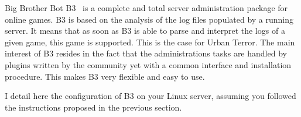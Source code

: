 %   
%
%
%
%

Big Brother Bot B3~\cite{b3} is a complete and total server administration
package for online games. 
B3 is based on the analysis of the log files populated by a running server. 
It means that as soon as B3 is able to parse and interpret the logs of a given
game, this game is supported. This is the case for Urban Terror. 
The main interest of B3 resides in the fact that the administrations tasks are
handled by plugins written by the community yet with a common interface and
installation procedure. This makes B3 very flexible and easy to use. 

I detail here the configuration of B3 on your Linux server, assuming you
followed the instructions proposed in the previous section.

